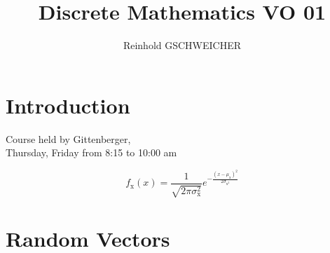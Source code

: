 \documentclass{article}
\title{Discrete Mathematics
VO 01}
\author{Reinhold GSCHWEICHER}
\begin{document}
\maketitle


\section*{Introduction}
Course held by Gittenberger, \\
Thursday, Friday from 8:15 to 10:00 am

\[
f_{\mathrm{x}}(x) = \frac{1}{\sqrt{2 \pi \sigma_{\mathrm{x}}^2}} 
e^{-\frac{(x - \mu_{\mathrm{x}})^2}{2\sigma_{\mathrm{x}^2}}}
\]




\section{Random Vectors}
\end{document}

